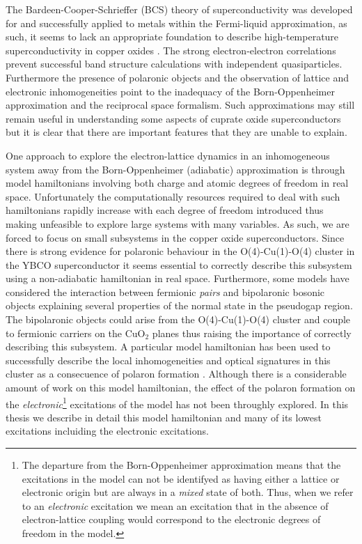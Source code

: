 The Bardeen-Cooper-Schrieffer (BCS) theory of superconductivity \cite{Bardeen1957} was developed for and successfully applied to metals within the Fermi-liquid approximation, as such, it seems to lack an appropriate foundation to describe high-temperature superconductivity in copper oxides \cite{Damascelli2003}.
The strong electron-electron correlations prevent successful band structure calculations with independent quasiparticles.
Furthermore the presence of polaronic objects and the observation of lattice and electronic inhomogeneities point to the inadequacy of the Born-Oppenheimer approximation and the reciprocal space formalism.
Such approximations may still remain useful in understanding some aspects of cuprate oxide superconductors but it is clear that there are important features that they are unable to explain.

One approach to explore the electron-lattice dynamics in an inhomogeneous system away from the Born-Oppenheimer (adiabatic) approximation is through model hamiltonians involving both charge and atomic degrees of freedom in real space.
Unfortunately the computationally resources required to deal with such hamiltonians rapidly increase with each degree of freedom introduced thus making unfeasible to explore large systems with many variables.
As such, we are forced to focus on small subsystems in the copper oxide superconductors.
Since there is strong evidence for polaronic behaviour in the O(4)-Cu(1)-O(4) cluster \cite{MustredeLeon1992,Salkola1994} in the YBCO superconductor it seems essential to correctly describe this subsystem using a non-adiabatic hamiltonian in real space.
Furthermore, some models have considered the interaction between fermionic \textit{pairs} and bipolaronic bosonic objects \cite{Bussmann-Holder2005,Mihailovic2001,Bar-Yam1991,doi:10.1142/S0217979200003812} explaining several properties of the normal state in the pseudogap region. 
The bipolaronic objects could arise from the O(4)-Cu(1)-O(4) cluster and couple to fermionic carriers on the CuO$_2$ planes thus raising the importance of correctly describing this subsystem.
A particular model hamiltonian has been used to successfully describe the local inhomogeneities and optical signatures in this cluster as a consecuence of polaron formation \cite{MustredeLeon1992, Salkola1994, Salkola1995,DeLeon1999, Leon2008, MirandaMena2007,Mena2006,MustredeLeon2000}.
Although there is a considerable amount of work on this model hamiltonian, the effect of the polaron formation on the \textit{electronic}\footnote{The departure from the Born-Oppenheimer approximation means that the excitations in the model can not be identifyed as having either a lattice or electronic origin but are always in a \textit{mixed} state of both. Thus, when we refer to an \textit{electronic} excitation we mean an excitation that in the absence of electron-lattice coupling would correspond to the electronic degrees of freedom in the model.} excitations of the model has not been throughly explored.
In this thesis we describe in detail this model hamiltonian and many of its lowest excitations incluiding the electronic excitations.

